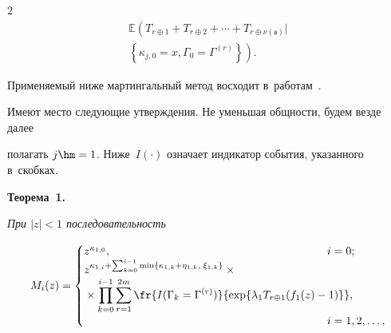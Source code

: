 \begin{multicols}{2}
\begin{multline*}
\mathbb E\left(T_{r\oplus1}+T_{r\oplus2}+\cdots+T_{r\oplus \nu(\mathfrak s)} \Big\vert \right.\\

\left.\left\{\kappa_{j,0}=x, \Gamma_0=\Gamma^{(r)}\right\}\right).

\end{multline*}



\vspace*{-3pt}



Применяемый ниже мартингальный метод восходит в~работам~\cite{Bacelli-1,Bacelli-2}.



Имеют место следующие утверждения. Не уменьшая общности, будем везде далее

полагать $j\hm=1$. Ниже~$I(\cdot)$ означает индикатор события, указанного в~скобках.





\smallskip



\noindent

\textbf{Теорема~1.}

\textit{ При $|z|<1$ последовательность}

  \begin{equation*}

    M_{i}(z)=

    \begin{cases}

      z^{\kappa_{1,0}}, & \hspace*{-33pt}i=0;\\

      z^{\kappa_{1,i}+ \sum\nolimits_{k=0}^{i-1}

        \min\{\kappa_{1,k}+\eta_{1,k},\;\xi_{1,k}\}}\times{}&\\

        {}\times 

     \displaystyle  \prod\limits_{k=0}^{i-1} \displaystyle \sum\limits_{r=1}^{2m}

      \fr{I(\Gamma_{k}=\Gamma^{(r)})}

      {\exp\{\lambda_{1}T_{r\oplus1}(f_{1}(z)-1)\}},&\\

      & \hspace*{-33pt}i=1,2,\ldots,

    \end{cases}


\end{equation*}
\end{multicols}

